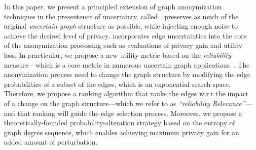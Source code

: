 
\vspace{2mm}


In this paper, we present a principled extension of graph anonymization techniques in the presentence of uncertainty, called \SysNameNS.
\SysName preserves as much of the original \emph{uncertain graph} structure as possible, while injecting enough noise to achieve the desired level of privacy.  
\SysName incorporates edge uncertainties into the core of the  anonymization processing such as evaluations of privacy gain and utility loss. 
In practicular, we propose a new utility metric based on the {\em reliability} measure---which is a core metric in numerous uncertain graph applications~\cite{Asthana_Predicting_2004,Zhao_Detecting_2014,Ghosh_On_2007}. 
The anonymization process need to change the graph structure by modifying the edge probabilities of a subset of the edges, which is an exponential search space. 
Therefore, we propose a ranking algorithm that ranks the edges w.r.t the impact of a change on the graph structure---which we refer to as {\em ``reliability Relevance''}---and 
that ranking will guide the edge selection process. 
Moreover, we propose a theoretically-founded probability-alteration strategy based on the entropy of graph degree sequence, which enables achieving maximum privacy gain for an added amount of 
perturbation. 





